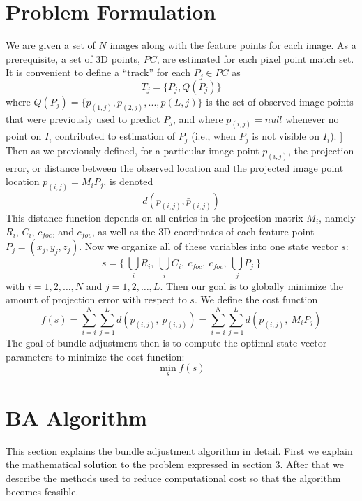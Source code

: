 \section{Problem Formulation}
We are given a set of $N$ images along with the feature points for each image. As a prerequisite,
a set of 3D points, $PC$, are estimated for each pixel point match set. It is convenient to define a
``track'' for each $P_j \in PC$ as
$$ T_j = \{P_j, Q(P_j)\} $$
where $Q(P_j) = \{p_{(1,j)}, p_{(2,j)}, ..., p{(L,j)}\}$ is the set of observed image points that
were previously used to predict $P_j$, and where $p_{(i,j)} = null$ whenever no point on $I_i$
contributed to estimation of $P_j$ (i.e., when $P_j$ is not visible on $I_i$). \newline
[[ reword this after writing earlier parts of pipeline to refer to ]] \newline
Then as we previously defined, for a particular image point $p_{(i, j)}$, the projection error,
or distance between the observed location and the projected image point location
$\bar{p}_{(i, j)} = M_i P_j$, is denoted
$$d(p_{(i,j)}, \bar{p}_{(i,j)})$$
This distance function depends on all entries in the projection matrix $M_i$, namely $R_i$, $C_i$, 
$c_{foc}$, and $c_{fov}$, as well as the 3D coordinates of each feature point
$P_j = (x_j, y_j, z_j)$. Now we organize all of these variables into one state vector $s$:
$$ s = \{\ \bigcup_{i}R_i, \ \bigcup_{i}C_i, \ c_{foc}, \ c_{fov}, \ \bigcup_{j}P_j \ \} $$
with $i = 1,2, \dots, N$ and $j = 1,2, \dots, L$. Then our goal is to globally minimize the amount
of projection error with respect to $s$. We define the cost function
\begin{equation}
  f(s) = \sum_{i=i}^{N} \sum_{j=1}^{L} d( p_{(i,j)}, \ \bar{p}_{(i,j)} ) =
  \sum_{i=i}^{N} \sum_{j=1}^{L} d( p_{(i,j)}, \ M_i P_j )
\end{equation}
The goal of bundle adjustment then is to compute the optimal state vector parameters to minimize
the cost function:
\begin{equation}
  \min_{s} f(s)
\end{equation}

\section{BA Algorithm}
This section explains the bundle adjustment algorithm in detail. First we explain the mathematical
solution to the problem expressed in section 3. After that we describe the methods used to reduce
computational cost so that the algorithm becomes feasible. 

